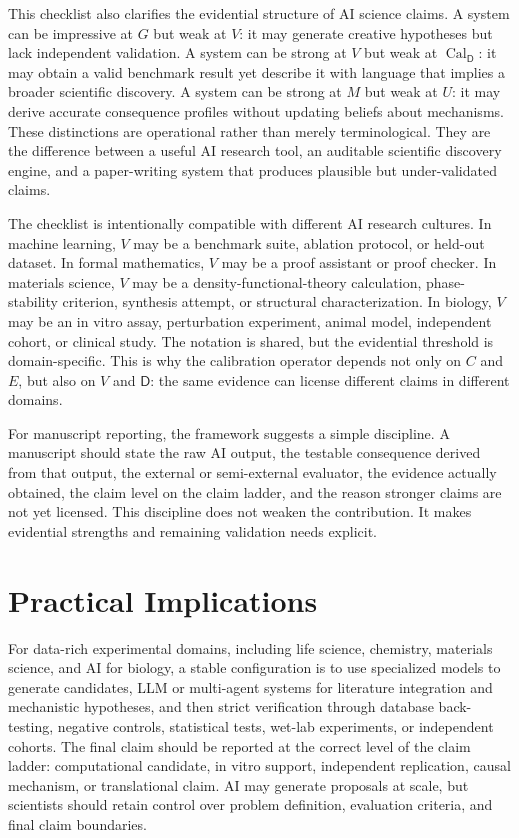 \documentclass[11pt,a4paper]{article}
\newcommand{\Cal}{\operatorname{Cal}}
\newcommand{\Dom}{\mathsf{D}}
\begin{document}
This checklist also clarifies the evidential structure of AI science claims. A system can be impressive at $G$ but weak at $V$: it may generate creative hypotheses but lack independent validation. A system can be strong at $V$ but weak at $\Cal_{\Dom}$: it may obtain a valid benchmark result yet describe it with language that implies a broader scientific discovery. A system can be strong at $M$ but weak at $U$: it may derive accurate consequence profiles without updating beliefs about mechanisms. These distinctions are operational rather than merely terminological. They are the difference between a useful AI research tool, an auditable scientific discovery engine, and a paper-writing system that produces plausible but under-validated claims.

The checklist is intentionally compatible with different AI research cultures. In machine learning, $V$ may be a benchmark suite, ablation protocol, or held-out dataset. In formal mathematics, $V$ may be a proof assistant or proof checker. In materials science, $V$ may be a density-functional-theory calculation, phase-stability criterion, synthesis attempt, or structural characterization. In biology, $V$ may be an in vitro assay, perturbation experiment, animal model, independent cohort, or clinical study. The notation is shared, but the evidential threshold is domain-specific. This is why the calibration operator depends not only on $C$ and $E$, but also on $V$ and $\Dom$: the same evidence can license different claims in different domains.

For manuscript reporting, the framework suggests a simple discipline. A manuscript should state the raw AI output, the testable consequence derived from that output, the external or semi-external evaluator, the evidence actually obtained, the claim level on the claim ladder, and the reason stronger claims are not yet licensed. This discipline does not weaken the contribution. It makes evidential strengths and remaining validation needs explicit.

\section{Practical Implications}

For data-rich experimental domains, including life science, chemistry, materials science, and AI for biology, a stable configuration is to use specialized models to generate candidates, LLM or multi-agent systems for literature integration and mechanistic hypotheses, and then strict verification through database back-testing, negative controls, statistical tests, wet-lab experiments, or independent cohorts. The final claim should be reported at the correct level of the claim ladder: computational candidate, in vitro support, independent replication, causal mechanism, or translational claim. AI may generate proposals at scale, but scientists should retain control over problem definition, evaluation criteria, and final claim boundaries.
\end{document}
